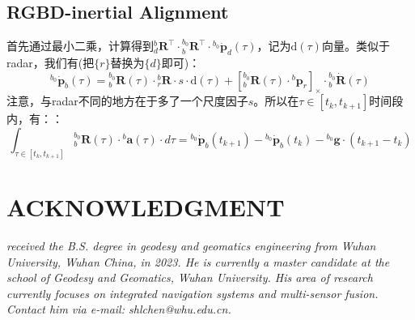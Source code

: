\documentclass[12pt, onecolumn]{article}
\newcommand\liehat[1]{\left[ #1 \right]_\times}
\newcommand\bsm[1]{\boldsymbol{\mathrm{#1}}}
\begin{document}
	\subsection{RGBD-inertial Alignment}
	首先通过最小二乘，计算得到${^{b}_{d}\boldsymbol{R}^\top}\cdot{^{b_0}_{b}\boldsymbol{R}^\top}\cdot{^{b_0}\dot{\boldsymbol{p}}_d(\tau)}$，记为$\bsm{d}(\tau)$向量。类似于radar，我们有(把$\{r\}$替换为$\{d\}$即可)：
	\begin{equation}
	{^{b_0}\dot{\boldsymbol{p}}_b(\tau)}={^{b_0}_{b}\boldsymbol{R}}(\tau)\cdot{^{b}_{r}\boldsymbol{R}}\cdot s\cdot\bsm{d}(\tau)
	+\liehat{{^{b_0}_{b}\boldsymbol{R}(\tau)}\cdot{^{b}{\boldsymbol{p}}_r}}\cdot{^{b_0}_{b}\dot{\boldsymbol{R}}(\tau)}
	\end{equation}
	注意，与radar不同的地方在于多了一个尺度因子$s$。所以在$\tau\in[t_k,t_{k+1}]$时间段内，有：：
	\begin{equation}
	\int_{\tau\in[t_k,t_{k+1}]}{^{b_0}_{b}\boldsymbol{R}(\tau)}\cdot{^{b}\boldsymbol{a}(\tau)}\cdot d\tau=
	{^{b_0}\dot{\boldsymbol{p}}_b(t_{k+1})}-{^{b_0}\dot{\boldsymbol{p}}_b(t_k)}
	-{^{b_0}\boldsymbol{g}}\cdot (t_{k+1}-t_k)
	\end{equation}
	
	
	\newpage
	
	
		
	\newpage
	\section*{ACKNOWLEDGMENT}
	\begin{tcolorbox}[colback=white,colframe=white!70!black,title={\bfseries Author Information}]
	\par\noindent
		\parbox[t]{\linewidth}{
	 \noindent{}
	 \emph{
	 received the B.S. degree in geodesy and geomatics engineering from Wuhan University, Wuhan China, in 2023.
	 He is currently a master candidate at the school of Geodesy and Geomatics, Wuhan University. His area of research currently focuses on integrated navigation systems and multi-sensor fusion.
	 Contact him via e-mail: shlchen@whu.edu.cn.
	 }}
	\end{tcolorbox}
		
		
\end{document}
